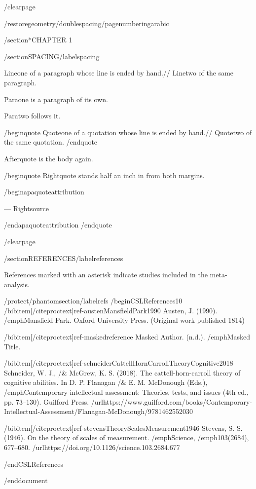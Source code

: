 /clearpage

/restoregeometry/doublespacing/pagenumbering{arabic}

/section*{CHAPTER 1}

/section{SPACING}/label{spacing}

Lineone of a paragraph whose line is ended by hand.//
Linetwo of the same paragraph.

Paraone is a paragraph of its own.

Paratwo follows it.

/begin{quote}
Quoteone of a quotation whose line is ended by hand.//
Quotetwo of the same quotation.
/end{quote}

Afterquote is the body again.

/begin{quote}
Rightquote stands half an inch in from both margins.

/begin{apaquoteattribution}

--- Rightsource

/end{apaquoteattribution}
/end{quote}

/clearpage

/section{REFERENCES}/label{references}

References marked with an asterisk indicate studies included in the
meta-analysis.

/protect/phantomsection/label{refs}
/begin{CSLReferences}{1}{0}
/bibitem[/citeproctext]{ref-austenMansfieldPark1990}
Austen, J. (1990). /emph{Mansfield {P}ark}. Oxford University Press.
(Original work published 1814)

/bibitem[/citeproctext]{ref-maskedreference}
Masked Author. (n.d.). /emph{Masked Title}.

/bibitem[/citeproctext]{ref-schneiderCattellHornCarrollTheoryCognitive2018}
Schneider, W. J., /& McGrew, K. S. (2018). The cattell-horn-carroll
theory of cognitive abilities. In D. P. Flanagan /& E. M. McDonough
(Eds.), /emph{Contemporary intellectual assessment: Theories, tests, and
issues} (4th ed., pp. 73--130). Guilford Press.
/url{https://www.guilford.com/books/Contemporary-Intellectual-Assessment/Flanagan-McDonough/9781462552030}

/bibitem[/citeproctext]{ref-stevensTheoryScalesMeasurement1946}
Stevens, S. S. (1946). On the theory of scales of measurement.
/emph{Science}, /emph{103}(2684), 677--680.
/url{https://doi.org/10.1126/science.103.2684.677}

/end{CSLReferences}




/end{document}
